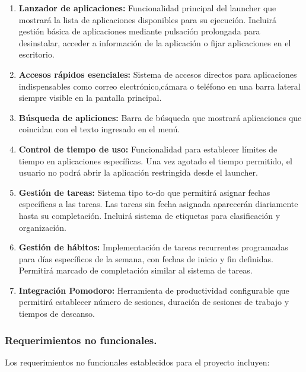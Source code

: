 \begin{enumerate}
    \item \textbf{Lanzador de aplicaciones:} Funcionalidad principal del launcher que mostrará la lista de aplicaciones disponibles para su ejecución. Incluirá gestión básica de aplicaciones mediante pulsación prolongada para desinstalar, acceder a información de la aplicación o fijar aplicaciones en el escritorio.
    
    \item \textbf{Accesos rápidos esenciales:} Sistema de accesos directos para aplicaciones indispensables como correo electrónico,cámara o teléfono en una barra lateral siempre visible en la pantalla principal.
    
    \item \textbf{Búsqueda de apliciones:} Barra de búsqueda que mostrará aplicaciones que coincidan con el texto ingresado en el menú.
    
    \item \textbf{Control de tiempo de uso:} Funcionalidad para establecer límites de tiempo en aplicaciones específicas. Una vez agotado el tiempo permitido, el usuario no podrá abrir la aplicación restringida desde el launcher.
    
    \item \textbf{Gestión de tareas:} Sistema tipo to-do que permitirá asignar fechas específicas a las tareas. Las tareas sin fecha asignada aparecerán diariamente hasta su completación. Incluirá sistema de etiquetas para clasificación y organización.
    
    \item \textbf{Gestión de hábitos:} Implementación de tareas recurrentes programadas para días específicos de la semana, con fechas de inicio y fin definidas. Permitirá marcado de completación similar al sistema de tareas.
    
    \item \textbf{Integración Pomodoro:} Herramienta de productividad configurable que permitirá establecer número de sesiones, duración de sesiones de trabajo y tiempos de descanso.
\end{enumerate}

\subsubsection{Requerimientos no funcionales.}

Los requerimientos no funcionales establecidos para el proyecto incluyen:

